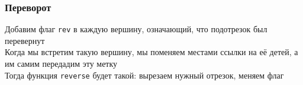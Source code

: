 \documentclass[a4paper]{article}
\newcommand{\code}[1]{\colorbox{codegray}{\texttt{#1}}}
\begin{document}
\subsubsection{Переворот}
Добавим флаг \code{rev} в каждую вершину, означающий, что подотрезок был перевернут\\[2mm]
\indent Когда мы встретим такую вершину, мы поменяем местами ссылки на её детей, а им самим передадим эту метку\\[2mm]
\indent Тогда функция \code{reverse} будет такой: вырезаем нужный отрезок, меняем флаг
\end{document}
